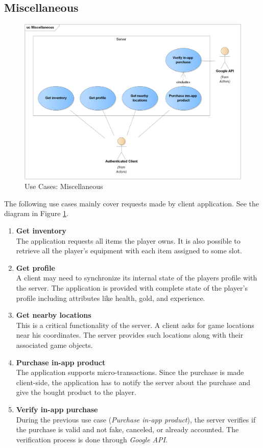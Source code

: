 	\subsection{Miscellaneous}
	\begin{figure}[h]	
		\includegraphics[width=\textwidth]{figures/UC_Miscellaneous}
		\centering			
		\caption{Use Cases: Miscellaneous}
		\label{fig:ucmisc}
	\end{figure}
	The following use cases mainly cover requests made by client application. See the diagram in Figure \ref{fig:ucmisc}.
	\begin{enumerate}
		\item \textbf{Get inventory}\\
		The application requests all items the player owns. It is also possible to retrieve all the player's equipment with each item assigned to some slot.
		
		\item \textbf{Get profile}\\
		A client may need to synchronize its internal state of the players profile with the server. The application is provided with complete state of the player's profile including attributes like health, gold, and experience.
		
		
		\item \textbf{Get nearby locations}\\
		This is a critical functionality of the server. A client asks for game locations near his coordinates. The server provides such locations along with their associated game objects.
		
		
		\item \textbf{Purchase in-app product}\\
		The application supports micro-transactions. Since the purchase is made client-side, the application has to notify the server about the purchase and give the bought product to the player. 
		
		
		\item \textbf{Verify in-app purchase}\\
		During the previous use case (\textit{Purchase in-app product}), the server verifies if the purchase is valid and not fake, canceled, or already accounted. The verification process is done through \textit{Google API}.
		
		
	\end{enumerate}
	

